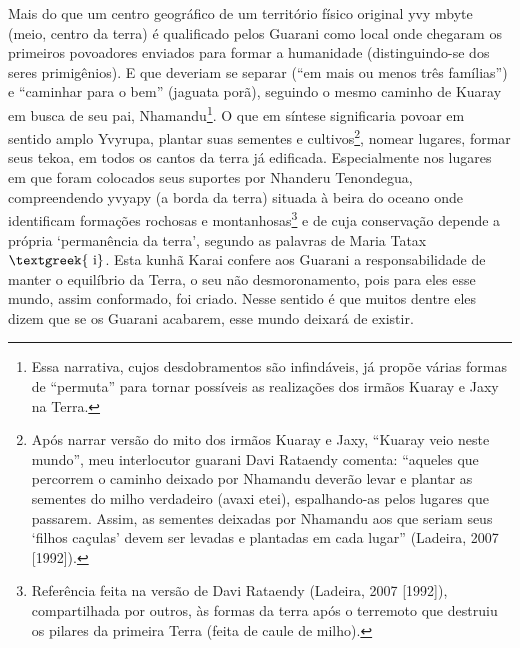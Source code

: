 \documentclass{article}
\begin{document}
Mais do que um centro geogr\'afico de um territ\'orio f\'isico original
yvy mbyte (meio, centro da terra) \'e qualificado pelos Guarani como
local onde chegaram os primeiros povoadores enviados para formar a
humanidade (distinguindo-se dos seres primig\^enios). E que deveriam se
separar ({\textquotedblleft}em mais ou menos tr\^es
fam\'ilias{\textquotedblright}) e {\textquotedblleft}caminhar para o
bem{\textquotedblright} (jaguata por\~a), seguindo o mesmo caminho de
Kuaray em busca de seu pai, Nhamandu\footnote{ Essa narrativa, cujos
desdobramentos s\~ao infind\'aveis, j\'a prop\~oe v\'arias formas de
{\textquotedblleft}permuta{\textquotedblright} para tornar poss\'iveis
as realiza\c{c}\~oes dos irm\~aos Kuaray e Jaxy na Terra.}.  O que em
s\'intese significaria povoar em sentido amplo Yvyrupa, plantar suas
sementes e cultivos\footnote{ Ap\'os narrar vers\~ao do mito dos
irm\~aos Kuaray e Jaxy, {\textquotedblleft}Kuaray veio neste
mundo{\textquotedblright}, meu interlocutor guarani Davi Rataendy
comenta: {\textquotedblleft}aqueles que percorrem o caminho deixado por
Nhamandu dever\~ao levar e plantar as sementes do milho verdadeiro
(avaxi etei), espalhando-as pelos lugares que passarem. Assim, as
sementes deixadas por Nhamandu aos que seriam seus
{\textquoteleft}filhos ca\c{c}ulas{\textquoteright} devem ser levadas e
plantadas em cada lugar{\textquotedblright} (Ladeira, 2007 [1992]).},
nomear lugares, formar seus tekoa, em todos os cantos da terra j\'a
edificada. Especialmente nos lugares em que foram colocados seus
suportes por Nhanderu Tenondegua, compreendendo yvyapy (a borda da
terra) situada \`a beira do oceano onde identificam forma\c{c}\~oes
rochosas e montanhosas\footnote{ Refer\^encia feita na vers\~ao de Davi
Rataendy (Ladeira, 2007 [1992]), compartilhada por outros, \`as formas
da terra ap\'os o terremoto que destruiu os pilares da primeira Terra
(feita de caule de milho). } e de cuja conserva\c{c}\~ao depende a
pr\'opria {\textquoteleft}perman\^encia da terra{\textquoteright},
segundo as palavras de Maria Tatax$\text{\textgreek{~i}}$. Esta kunh\~a
Karai confere aos Guarani a responsabilidade de manter o equil\'ibrio
da Terra, o seu n\~ao desmoronamento, pois para eles esse mundo, assim
conformado, foi criado. Nesse sentido \'e que muitos dentre eles dizem
que se os Guarani acabarem, esse mundo deixar\'a de existir. 
\end{document}
